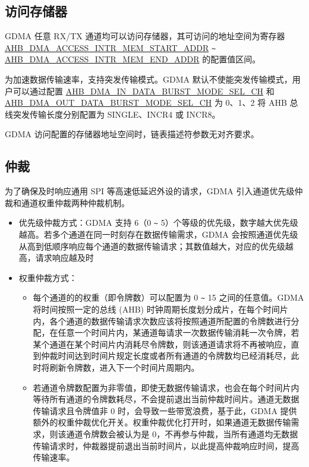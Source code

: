 \documentclass[main\_\_CN.tex]{subfiles}
\begin{document}
\subsection{访问存储器}\label{sec:dma-access-inter-ram}
GDMA 任意 RX/TX 通道均可以访问存储器，其可访问的地址空间为寄存器 \hyperref[fielddesc:AHBDMAACCESSINTRMEMSTARTADDR]{AHB\_DMA\_ACCESS\_INTR\_MEM\_START\_ADDR} \verb+~+ \hyperref[fielddesc:AHBDMAACCESSINTRMEMENDADDR]{AHB\_DMA\_ACCESS\_INTR\_MEM\_END\_ADDR} 的配置值区间。

为加速数据传输速率，支持突发传输模式。GDMA 默认不使能突发传输模式，用户可以通过配置 \hyperref[fielddesc:AHBDMAINDATABURSTMODESELCHN]{AHB\_DMA\_IN\_DATA\_BURST\_MODE\_SEL\_CH} 和 \hyperref[fielddesc:AHBDMAOUTDATABURSTMODESELCHN]{AHB\_DMA\_OUT\_DATA\_BURST\_MODE\_SEL\_CH} 为 0、1、2 将 AHB 总线突发传输长度分别配置为 SINGLE、INCR4 或 INCR8。

GDMA 访问配置的存储器地址空间时，链表描述符参数无对齐要求。

\subsection{仲裁}

为了确保及时响应通用 SPI 等高速低延迟外设的请求，GDMA 引入通道优先级仲裁和通道权重仲裁两种仲裁机制。

\begin{itemize}
\item 优先级仲裁方式：GDMA 支持 6（0 \verb+~+ 5）个等级的优先级，数字越大优先级越高。若多个通道在同一时刻存在数据传输需求，GDMA 会按照通道优先级从高到低顺序响应每个通道的数据传输请求；其数值越大，对应的优先级越高，请求响应越及时
\item 权重仲裁方式：
    \begin{itemize}
        \item 每个通道的的权重（即令牌数）可以配置为 0 \verb+~+ 15 之间的任意值。GDMA 将时间按照一定的总线 (AHB) 时钟周期长度划分成片，在每个时间片内，各个通道的数据传输请求次数应该将按照通道所配置的令牌数进行分配，在任意一个时间片内，某通道每请求一次数据传输消耗一次令牌，若某个通道在某个时间片内消耗尽令牌数，则该通道请求将不再被响应，直到仲裁时间达到时间片规定长度或者所有通道的令牌数均已经消耗尽，此时将刷新令牌数，进入下一个时间片周期内。
        \item 若通道令牌数配置为非零值，即使无数据传输请求，也会在每个时间片内等待所有通道的令牌数耗尽，不会提前退出当前仲裁时间片。通道无数据传输请求且令牌值非 0 时，会导致一些带宽浪费，基于此，GDMA 提供额外的权重仲裁优化开关。权重仲裁优化打开时，如果通道无数据传输需求，则该通道令牌数会被认为是 0，不再参与仲裁，当所有通道均无数据传输请求时，仲裁器提前退出当前时间片，以此提高仲裁响应时间，提高传输速率。
    \end{itemize}
\end{itemize}
\end{document}
